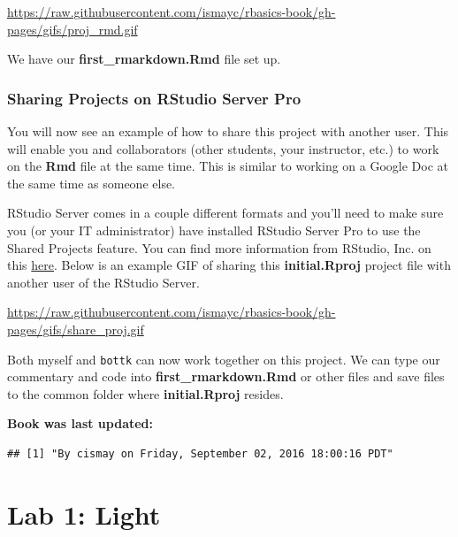 \documentclass[]{tufte-book}
\begin{document}
\vspace{0.1in}

\begin{center}\footnotesize{\url{https://raw.githubusercontent.com/ismayc/rbasics-book/gh-pages/gifs/proj_rmd.gif}}\end{center}

\vspace{0.1in}

We have our \textbf{first\_rmarkdown.Rmd} file set up.

\subsection{Sharing Projects on RStudio Server
Pro}\label{sharing-projects-on-rstudio-server-pro}

You will now see an example of how to share this project with another
user. This will enable you and collaborators (other students, your
instructor, etc.) to work on the \textbf{Rmd} file at the same time.
This is similar to working on a Google Doc at the same time as someone
else.

RStudio Server comes in a couple different formats and you'll need to
make sure you (or your IT administrator) have installed RStudio Server
Pro to use the Shared Projects feature. You can find more information
from RStudio, Inc. on this
\href{https://support.rstudio.com/hc/en-us/articles/211659737-Sharing-Projects-in-RStudio-Server-Pro}{here}.
Below is an example GIF of sharing this \textbf{initial.Rproj} project
file with another user of the RStudio Server.

\vspace{0.1in}

\begin{center}\footnotesize{\url{https://raw.githubusercontent.com/ismayc/rbasics-book/gh-pages/gifs/share_proj.gif}}\end{center}

\vspace{0.1in}

Both myself and \texttt{bottk} can now work together on this project. We
can type our commentary and code into \textbf{first\_rmarkdown.Rmd} or
other files and save files to the common folder where
\textbf{initial.Rproj} resides.

\textbf{Book was last updated:}

\begin{verbatim}
## [1] "By cismay on Friday, September 02, 2016 18:00:16 PDT"
\end{verbatim}

\chapter{Lab 1: Light}\label{light}


\end{document}
